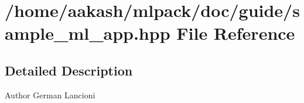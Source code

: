 \section{/home/aakash/mlpack/doc/guide/sample\+\_\+ml\+\_\+app.hpp File Reference}
\label{sample__ml__app_8hpp}


\subsection{Detailed Description}
\begin{DoxyAuthor}{Author}
German Lancioni 
\end{DoxyAuthor}

